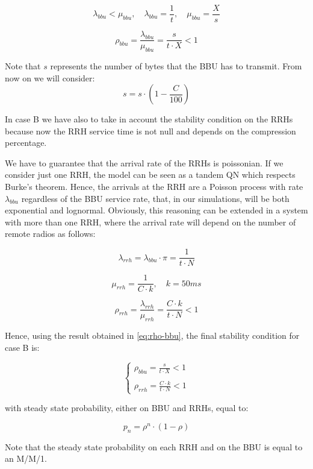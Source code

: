 \documentclass[11pt,a4paper,oneside, openright]{article}
\begin{document}
$$ \lambda_{bbu} < \mu_{bbu}, \quad \lambda_{bbu} = \frac{1}{t}, \quad \mu_{bbu} = \frac{X}{s}$$

\begin{equation} \label{eq:rho-bbu}
\rho_{bbu} = \frac{\lambda_{bbu}}{\mu_{bbu}} = \frac{s}{t \cdot X} < 1
\end{equation}

Note that $s$ represents the number of bytes that the BBU has to transmit. From now on we will consider:
$$s = s\cdot(1-\frac{C}{100})$$

In case B we have also to take in account the stability condition on the RRHs because now the RRH service time is not null and depends on the compression percentage. 

We have to guarantee that the arrival rate of the RRHs is poissonian. If we consider just one RRH, the model can be seen as a tandem QN which respects Burke's theorem. Hence, the arrivals at the RRH are a Poisson process with rate $ \lambda_{bbu} $ regardless of the BBU service rate, that, in our simulations, will be both exponential and lognormal. 
Obviously, this reasoning can be extended in a system with more than one RRH, where the arrival rate will depend on the number of remote radios as follows:

$$ \lambda_{rrh} = \lambda_{bbu} \cdot \pi = \frac{1}{t \cdot N} $$

$$ \mu_{rrh} = \frac{1}{C \cdot k}, \quad k = 50ms $$

\begin{equation} \label{eq:rho-rrh}
\rho_{rrh} = \frac{\lambda_{rrh}}{\mu_{rrh}} = \frac{C \cdot k}{t \cdot N} < 1
\end{equation}

Hence, using the result obtained in \eqref{eq:rho-bbu}, the final stability condition for case B is:

$$ \begin{cases} \rho_{bbu} = \frac{s}{t \cdot X} < 1 \\ \\ \rho_{rrh} = \frac{C \cdot k}{t \cdot N} < 1 \end{cases} $$

with steady state probability, either on BBU and RRHs, equal to:

$$ p_{n} = \rho^n \cdot (1 - \rho) $$

Note that the steady state probability on each RRH and on the BBU is equal to an M/M/1.
\end{document}
